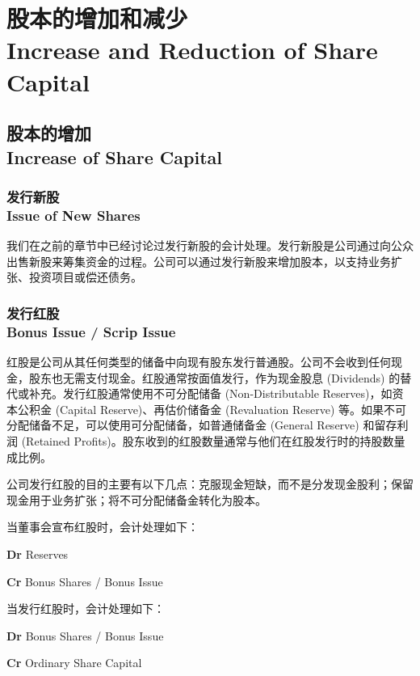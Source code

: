 \documentclass{article}
\begin{document}
\newpage

\section{股本的增加和减少\\Increase and Reduction of Share Capital}

\subsection{股本的增加\\Increase of Share Capital}

    \subsubsection{发行新股\\Issue of New Shares}

    \noindent 我们在之前的章节中已经讨论过发行新股的会计处理。发行新股是公司通过向公众出售新股来筹集资金的过程。公司可以通过发行新股来增加股本，以支持业务扩张、投资项目或偿还债务。

    \subsubsection{发行红股\\Bonus Issue / Scrip Issue}

    \noindent 红股是公司从其任何类型的储备中向现有股东发行普通股。公司不会收到任何现金，股东也无需支付现金。红股通常按面值发行，作为现金股息 (Dividends) 的替代或补充。发行红股通常使用不可分配储备 (Non-Distributable Reserves)，如资本公积金 (Capital Reserve)、再估价储备金 (Revaluation Reserve) 等。如果不可分配储备不足，可以使用可分配储备，如普通储备金 (General Reserve) 和留存利润 (Retained Profits)。股东收到的红股数量通常与他们在红股发行时的持股数量成比例。

    公司发行红股的目的主要有以下几点：克服现金短缺，而不是分发现金股利；保留现金用于业务扩张；将不可分配储备金转化为股本。

    当董事会宣布红股时，会计处理如下：
    \begin{mdframed}[backgroundcolor=gray!10]
    \textbf{Dr} Reserves

    \noindent \hspace{1.7em}\textbf{Cr} Bonus Shares / Bonus Issue
    \end{mdframed}

    当发行红股时，会计处理如下：
    \begin{mdframed}[backgroundcolor=gray!10]
    \textbf{Dr} Bonus Shares / Bonus Issue

    \noindent \hspace{1.7em}\textbf{Cr} Ordinary Share Capital
    \end{mdframed}
\end{document}
